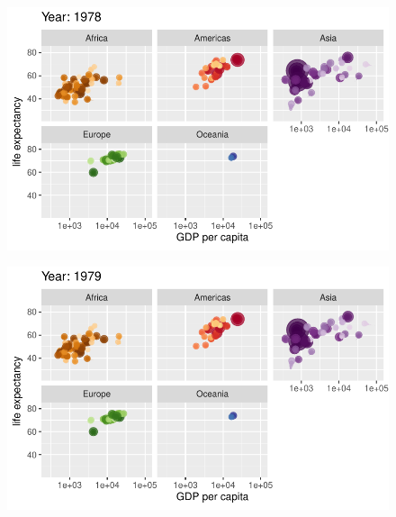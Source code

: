 \documentclass[
  letterpaper,
  DIV=11,
  numbers=noendperiod]{scrartcl}
\begin{document}
\begin{figure}[H]

{\centering \includegraphics{class05_files/figure-pdf/unnamed-chunk-24-48.pdf}

}

\end{figure}

\begin{figure}[H]

{\centering \includegraphics{class05_files/figure-pdf/unnamed-chunk-24-49.pdf}

}

\end{figure}
\end{document}

